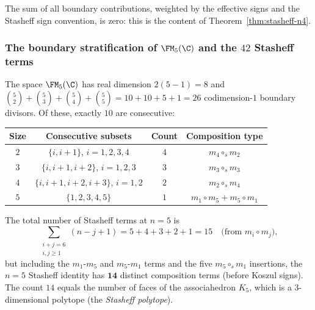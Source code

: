 \begin{computation}[Explicit boundary signs for $n = 4$;
\ClaimStatusProvedHere]
The sum of all boundary contributions, weighted by the
effective signs and the Stasheff sign convention, is
zero: this is the content of
Theorem~\ref{thm:stasheff-n4}.
\end{computation}

\subsubsection{The boundary stratification of $\FM_5(\C)$
and the $42$ Stasheff terms}

\begin{proposition}
The space $\FM_5(\C)$ has real dimension $2(5-1) = 8$ and
$\binom{5}{2} + \binom{5}{3} + \binom{5}{4} + \binom{5}{5}
= 10 + 10 + 5 + 1 = 26$ codimension-$1$ boundary divisors.
Of these, exactly $10$ are consecutive:
\begin{center}
\renewcommand{\arraystretch}{1.1}
\begin{tabular}{c|c|c|c}
\textbf{Size} & \textbf{Consecutive subsets}
 & \textbf{Count} & \textbf{Composition type} \\
\hline
$2$ & $\{i,i{+}1\}$, $i = 1,2,3,4$ & $4$
 & $m_4 \circ_s m_2$ \\
$3$ & $\{i,i{+}1,i{+}2\}$, $i = 1,2,3$ & $3$
 & $m_3 \circ_s m_3$ \\
$4$ & $\{i,i{+}1,i{+}2,i{+}3\}$, $i = 1,2$ & $2$
 & $m_2 \circ_s m_4$ \\
$5$ & $\{1,2,3,4,5\}$ & $1$
 & $m_1 \circ m_5 + m_5 \circ m_1$
\end{tabular}
\end{center}
The total number of Stasheff terms at $n = 5$ is
\[
\sum_{\substack{i + j = 6 \\ i,j \ge 1}}
(n - j + 1) = 5 + 4 + 3 + 2 + 1 = 15
\quad\text{(from $m_i \circ m_j$)},
\]
but including the $m_1$-$m_5$ and $m_5$-$m_1$ terms and
the five $m_5 \circ_s m_1$ insertions, the $n = 5$
Stasheff identity has $\mathbf{14}$ distinct composition
terms (before Koszul signs). The count $14$ equals
the number of faces of the associahedron $K_5$, which
is a $3$-dimensional polytope (the \emph{Stasheff
polytope}).
\end{proposition}

